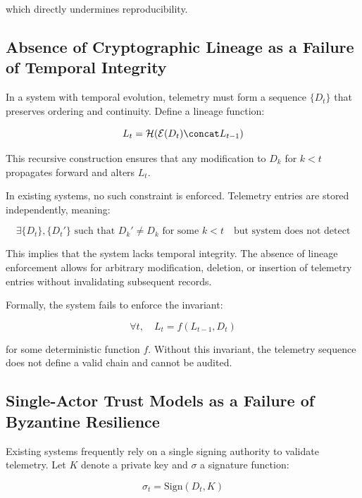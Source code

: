 which directly undermines reproducibility.

\subsection{Absence of Cryptographic Lineage as a Failure of Temporal Integrity}

In a system with temporal evolution, telemetry must form a sequence $\{D_t\}$ that preserves ordering and continuity. Define a lineage function:

\begin{equation}
L_t = \mathcal{H}(\mathcal{E}(D_t) \concat L_{t-1})
\end{equation}

This recursive construction ensures that any modification to $D_k$ for $k < t$ propagates forward and alters $L_t$.

In existing systems, no such constraint is enforced. Telemetry entries are stored independently, meaning:

\begin{equation}
\exists \{D_t\}, \{D_t'\} \text{ such that } D_k' \neq D_k \text{ for some } k < t \quad \text{but system does not detect}
\end{equation}

This implies that the system lacks temporal integrity. The absence of lineage enforcement allows for arbitrary modification, deletion, or insertion of telemetry entries without invalidating subsequent records.

Formally, the system fails to enforce the invariant:

\begin{equation}
\forall t, \quad L_t = f(L_{t-1}, D_t)
\end{equation}

for some deterministic function $f$. Without this invariant, the telemetry sequence does not define a valid chain and cannot be audited.

\subsection{Single-Actor Trust Models as a Failure of Byzantine Resilience}

Existing systems frequently rely on a single signing authority to validate telemetry. Let $K$ denote a private key and $\sigma$ a signature function:

\begin{equation}
\sigma_t = \text{Sign}(D_t, K)
\end{equation}

